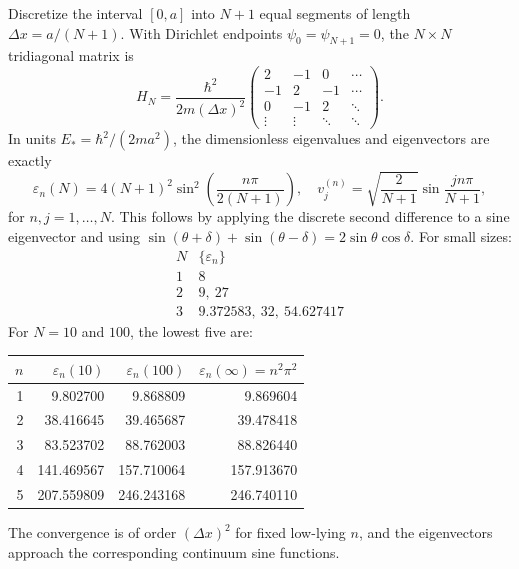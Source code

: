 Discretize the interval $[0,a]$ into $N+1$
equal segments of length $\Delta x=a/(N+1)$.
With Dirichlet endpoints $\psi_0=\psi_{N+1}=0$,
the $N\times N$ tridiagonal matrix is
\begin{equation}
\boxed{H_N=\frac{\hbar^2}{2m(\Delta x)^2}
\begin{pmatrix}
2&-1&0&\cdots\\
-1&2&-1&\cdots\\
0&-1&2&\ddots\\
\vdots&\vdots&\ddots&\ddots
\end{pmatrix}}.
\end{equation}
In units $E_*= \hbar^2/(2ma^2)$,
the dimensionless eigenvalues and eigenvectors
are exactly
\begin{equation}
\boxed{\varepsilon_n(N)=4(N+1)^2
\sin^2\left(\frac{n\pi}{2(N+1)}\right)},\quad
\boxed{v^{(n)}_j=
\sqrt{\frac2{N+1}}\sin\frac{jn\pi}{N+1}},
\end{equation}
for $n,j=1,\ldots,N$.
This follows by applying the discrete second
difference to a sine eigenvector and using
$\sin(\theta+\delta)+\sin(\theta-\delta)
=2\sin\theta\cos\delta$.
For small sizes:
\begin{equation}
\begin{array}{c|l}
N & \{\varepsilon_n\}\\\hline
1& 8\\
2&9,\ 27\\
3&9.372583,\ 32,\ 54.627417
\end{array}
\end{equation}
For $N=10$ and $100$, the lowest five are:
\begin{center}
\begin{tabular}{rrrr}
\toprule
$n$ & $\varepsilon_n(10)$&$\varepsilon_n(100)$
& $\varepsilon_n(\infty)=n^2\pi^2$\\
\midrule
1&9.802700&9.868809&9.869604\\
2&38.416645&39.465687&39.478418\\
3&83.523702&88.762003&88.826440\\
4&141.469567&157.710064&157.913670\\
5&207.559809&246.243168&246.740110\\
\bottomrule
\end{tabular}
\end{center}
The convergence is of order $(\Delta x)^2$
for fixed low-lying $n$, and the eigenvectors
approach the corresponding continuum sine
functions.

